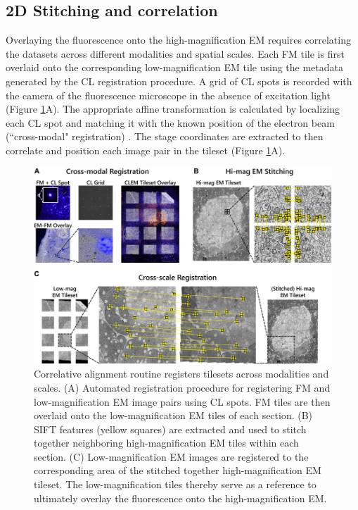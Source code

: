 \subsection{2D Stitching and correlation}
\label{sec:3R_stitching}
Overlaying the fluorescence onto the high-magnification EM requires correlating the datasets across different modalities and spatial scales. Each FM tile is first overlaid onto the corresponding low-magnification EM tile using the metadata generated by the CL registration procedure. A grid of CL spots is recorded with the camera of the fluorescence microscope in the absence of excitation light (Figure \ref{fig:3.3_reconstruction}A). The appropriate affine transformation is calculated by localizing each CL spot and matching it with the known position of the electron beam (``cross-modal" registration) \cite{haring2017automated}. The stage coordinates are extracted to then correlate and position each image pair in the tileset (Figure \ref{fig:3.3_reconstruction}A).

\begin{figure}[!tb]
    \centering
    \includegraphics[width=\linewidth]{chapter-3/figures_JPEG_LQ/fig3-3_reconstruction.jpg}
    \caption{Correlative alignment routine registers tilesets across modalities and scales.
    (A) Automated registration procedure for registering FM and low-magnification EM image pairs using CL spots. FM tiles are then overlaid onto the low-magnification EM tiles of each section.
    (B) SIFT features (yellow squares) are extracted and used to stitch together neighboring high-magnification EM tiles within each section.
    (C) Low-magnification EM images are registered to the corresponding area of the stitched together high-magnification EM tileset. The low-magnification tiles thereby serve as a reference to ultimately overlay the fluorescence onto the high-magnification EM.}
    \label{fig:3.3_reconstruction}
\end{figure}

